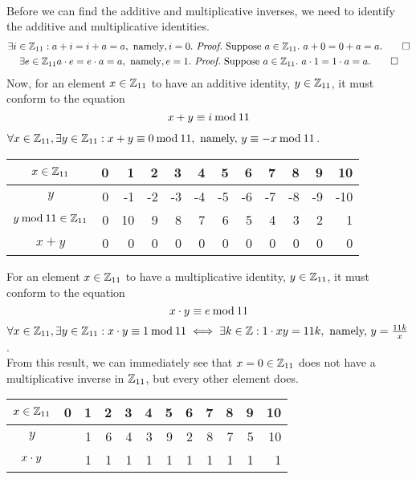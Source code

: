 \documentclass[a4paper,12pt]{report}
\begin{document}
\newpage
{}
\sol \\
Before we can find the additive and multiplicative inverses, we need to identify the additive and multiplicative identities. 
\begin{gather*}
	\exists i\in\bbz_{11}: a+i=i+a=a,\ \text{namely}, i=0.\ \textit{Proof.}\ \Suppose a \in \bbz_{11}.\ a + 0 = 0 + a = a. \qed \\
	\exists e\in\bbz_{11} a \cd e = e \cd a = a,\ \text{namely}, e=1.\ \textit{Proof.}\ \Suppose a\in\bbz_{11}.\ a \cd 1 = 1 \cd a = a. \qed
\end{gather*}
Now, for an element $x\in\mathbb{Z}_{11}$ to have an additive identity, $y\in\mathbb{Z}_{11}$, it must conform to the equation
$$
	x + y \equiv i \mathbin{\mathrm{mod}}{11} 
$$
$\forall x\in\mathbb{Z}_{11},\exists y\in\mathbb{Z}_{11}: x+y\equiv 0\mathbin{\mathrm{mod}}{11},\ \text{namely,}\ y\equiv -x\mathbin{\mathrm{mod}}{11}$.
\begin{center}
	\begin{tabular}{c|rrrrrrrrrrr}
		$x\in\mathbb{Z}_{11}$ & 0 & 1 & 2 & 3 & 4 & 5 & 6 & 7 & 8 & 9 & 10 \\ \hline
		$y$							& 0 & -1 & -2 & -3 & -4 & -5 & -6 & -7 & -8 & -9 & -10 \\ \hline
		$y\mathbin{\mathrm{mod}}{11}\in\mathbb{Z}_{11}$ & 0 & 10 & 9 & 8 & 7 & 6 & 5 & 4 & 3 & 2 & 1 \\ \hline
		$x + y$ & 0 & 0 & 0 & 0 & 0 & 0 & 0 & 0 & 0 & 0 & 0 \\
	\end{tabular}
\end{center}

For an element $x\in\mathbb{Z}_{11}$ to have a multiplicative identity, $y\in\mathbb{Z}_{11}$, it must conform to the equation
$$
	x\cdot y \equiv e \mathbin{\mathrm{mod}}{11}
$$
$\forall x\in\bbz_{11},\exists y\in\bbz_{11}:x\cd y\equiv 1\Mod{11}\iff\exists k\in\bbz: 1\cd xy=11k,\ \text{namely,}\ y = \frac{11k}{x}$. \\
From this result, we can immediately see that $x=0\in\mathbb{Z}_{11}$ does not have a multiplicative inverse in $\mathbb{Z}_{11}$, but every other element does.
\begin{center}
	\begin{tabular}{c|rrrrrrrrrrr}
		$x\in\mathbb{Z}_{11}$ & 0 & 1 & 2 & 3 & 4 & 5 & 6 & 7 & 8 & 9 & 10 \\ \hline
		$y$ & & 1 & 6 & 4 & 3 & 9 & 2 & 8 & 7 & 5 & 10 \\ \hline
		$x\cdot y$ & & 1 & 1 & 1 & 1 & 1 & 1 & 1 & 1 & 1 & 1 \\ 
	\end{tabular}
\end{center}
\end{document}
